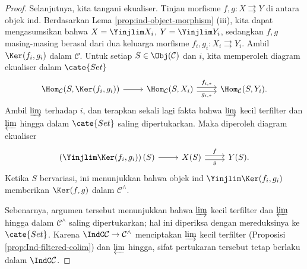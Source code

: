 \begin{proof}
	Selanjutnya, kita tangani ekualiser. Tinjau morfisme $f, g: X \rightrightarrows Y$ di antara objek ind. Berdasarkan Lema \ref{prop:ind-object-morphism} (iii), kita dapat mengasumsikan bahwa $X = \Yinjlim X_i$, $Y = \Yinjlim Y_i$, sedangkan $f, g$ masing-masing berasal dari dua keluarga morfisme $f_i, g_i: X_i \rightrightarrows Y_i$. Ambil $\Ker(f_i, g_i)$ dalam $\mathcal{C}$. Untuk setiap $S \in \Obj(\mathcal{C})$ dan $i$, kita memperoleh diagram ekualiser dalam $\cate{Set}$
	\[\begin{tikzcd}
		\Hom_{\mathcal{C}}(S, \Ker(f_i, g_i)) \arrow[r] & \Hom_{\mathcal{C}}(S, X_i) \arrow[r, shift left, "{f_{i, *}}"] \arrow[r, shift right, "{g_{i, *}}"'] & \Hom_{\mathcal{C}}(S, Y_i).
	\end{tikzcd}\]
	Ambil $\varinjlim$ terhadap $i$, dan terapkan sekali lagi fakta bahwa $\varinjlim$ kecil terfilter dan $\varprojlim$ hingga dalam $\cate{Set}$ saling dipertukarkan. Maka diperoleh diagram ekualiser
	\[\begin{tikzcd}
		\left(\Yinjlim \Ker(f_i, g_i)\right)(S) \arrow[r] & X(S) \arrow[r, shift left, "f"] \arrow[r, shift right, "g"'] & Y(S).
	\end{tikzcd}\]
	Ketika $S$ bervariasi, ini menunjukkan bahwa objek ind $\Yinjlim \Ker(f_i, g_i)$ memberikan $\Ker(f, g)$ dalam $\mathcal{C}^\wedge$.
	
	Sebenarnya, argumen tersebut menunjukkan bahwa $\varinjlim$ kecil terfilter dan $\varprojlim$ hingga dalam $\mathcal{C}^\wedge$ saling dipertukarkan; hal ini diperiksa dengan mereduksinya ke $\cate{Set}$. Karena $\IndC\mathcal{C} \to \mathcal{C}^\wedge$ menciptakan $\varinjlim$ kecil terfilter (Proposisi \ref{prop:Ind-filtered-colim}) dan $\varprojlim$ hingga, sifat pertukaran tersebut tetap berlaku dalam $\IndC\mathcal{C}$.
\end{proof}

